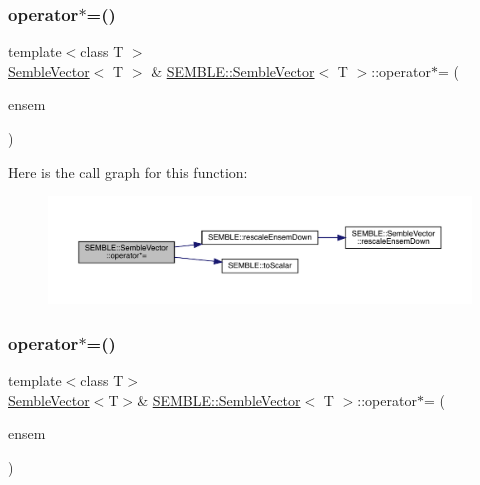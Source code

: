 \mbox{\label{structSEMBLE_1_1SembleVector_ad559efc087b0f00f20ec725270946057}} 
\subsubsection{\texorpdfstring{operator$\ast$=()}{operator*=()}\hspace{0.1cm}{\footnotesize\ttfamily [5/6]}}
{\footnotesize\ttfamily template$<$class T $>$ \\
\mbox{\hyperlink{structSEMBLE_1_1SembleVector}{Semble\+Vector}}$<$ T $>$ \& \mbox{\hyperlink{structSEMBLE_1_1SembleVector}{S\+E\+M\+B\+L\+E\+::\+Semble\+Vector}}$<$ T $>$\+::operator$\ast$= (\begin{DoxyParamCaption}\item[{const typename \mbox{\hyperlink{structSEMBLE_1_1PromoteEnsem}{Promote\+Ensem}}$<$ T $>$\+::Type \&}]{ensem }\end{DoxyParamCaption})}

Here is the call graph for this function\+:
\nopagebreak
\begin{figure}[H]
\begin{center}
\leavevmode
\includegraphics[width=350pt]{d9/d94/structSEMBLE_1_1SembleVector_ad559efc087b0f00f20ec725270946057_cgraph}
\end{center}
\end{figure}
\mbox{\label{structSEMBLE_1_1SembleVector_aa61633310e85cdb57bac352a2cf8fd96}} 
\subsubsection{\texorpdfstring{operator$\ast$=()}{operator*=()}\hspace{0.1cm}{\footnotesize\ttfamily [6/6]}}
{\footnotesize\ttfamily template$<$class T$>$ \\
\mbox{\hyperlink{structSEMBLE_1_1SembleVector}{Semble\+Vector}}$<$T$>$\& \mbox{\hyperlink{structSEMBLE_1_1SembleVector}{S\+E\+M\+B\+L\+E\+::\+Semble\+Vector}}$<$ T $>$\+::operator$\ast$= (\begin{DoxyParamCaption}\item[{const typename \mbox{\hyperlink{structSEMBLE_1_1PromoteEnsem}{Promote\+Ensem}}$<$ T $>$\+::Type \&}]{ensem }\end{DoxyParamCaption})}

